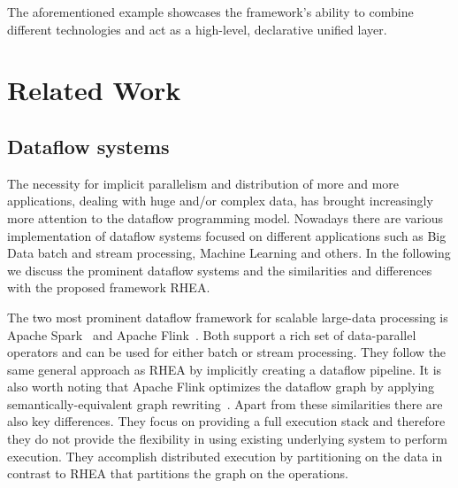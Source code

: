 \documentclass[sigplan,screen,review,anonymous]{acmart}
\begin{document}
The aforementioned example showcases the framework's ability to combine different
technologies and act as a high-level, declarative unified layer.

\section{Related Work} \label{sec:related}

\subsection{Dataflow systems}

The necessity for implicit parallelism and distribution of more and more
applications, dealing with huge and/or complex data, has brought increasingly
more attention to the dataflow programming model. Nowadays there are various
implementation of dataflow systems focused on different applications such as
Big Data batch and stream processing, Machine Learning and others.
In the following we discuss the prominent dataflow systems and the similarities
and differences with the proposed framework \textsc{RHEA}.

The two most prominent dataflow framework for scalable large-data processing
is Apache Spark~\cite{spark} and Apache Flink~\cite{stratosphere}. Both support
a rich set of data-parallel operators and can be used for either batch or
stream processing. They follow the same general approach as \textsc{RHEA} by
implicitly creating a dataflow pipeline. It is also worth noting that Apache Flink
optimizes the dataflow graph by applying semantically-equivalent graph rewriting~\cite{blackbox}.
Apart from these similarities there are also key differences.
They focus on providing a full execution stack and therefore they do not
provide the flexibility in using
existing  underlying system to perform execution. They accomplish distributed
execution by partitioning on the data in contrast to \textsc{RHEA} that partitions
the graph on the operations.
\end{document}
